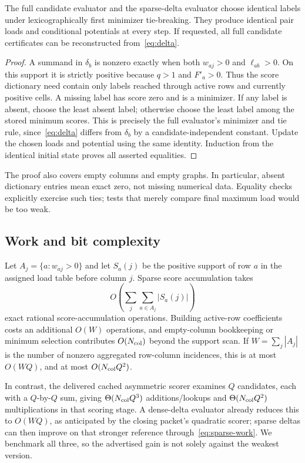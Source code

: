 \documentclass[11pt,letterpaper]{article}
\theoremstyle{remark}\newtheorem{remark}[theorem]{Remark}
\begin{document}
\begin{proposition}\label{prop:sparse}
The full candidate evaluator and the sparse-delta evaluator choose identical labels under lexicographically first minimizer tie-breaking. They produce identical pair loads and conditional potentials at every step. If requested, all full candidate certificates can be reconstructed from~\eqref{eq:delta}.
\end{proposition}
\begin{proof}
A summand in $\delta_b$ is nonzero exactly when both $w_{aj}>0$ and $\ell_{ab}>0$. On this support it is strictly positive because $q>1$ and $F'_a>0$. Thus the score dictionary need contain only labels reached through active rows and currently positive cells. A missing label has score zero and is a minimizer. If any label is absent, choose the least absent label; otherwise choose the least label among the stored minimum scores. This is precisely the full evaluator's minimizer and tie rule, since~\eqref{eq:delta} differs from $\delta_b$ by a candidate-independent constant. Update the chosen loads and potential using the same identity. Induction from the identical initial state proves all asserted equalities.
\end{proof}
The proof also covers empty columns and empty graphs. In particular, absent dictionary entries mean exact zero, not missing numerical data. Equality checks explicitly exercise such ties; tests that merely compare final maximum load would be too weak.

\subsection{Work and bit complexity}
Let $A_j=\{a:w_{aj}>0\}$ and let $S_a(j)$ be the positive support of row $a$ in the assigned load table before column $j$. Sparse score accumulation takes
\begin{equation}\label{eq:sparse-work}
 O\!\left(\sum_j\sum_{a\in A_j}|S_a(j)|\right)
\end{equation}
exact rational score-accumulation operations. Building active-row coefficients costs an additional $O(W)$ operations, and empty-column bookkeeping or minimum selection contributes $O(N_{\rm col})$ beyond the support scan. If $W=\sum_j|A_j|$ is the number of nonzero aggregated row-column incidences, this is at most $O(WQ)$, and at most $O(N_{\rm col}Q^2)$.

In contrast, the delivered cached asymmetric scorer examines $Q$ candidates, each with a $Q$-by-$Q$ sum, giving $\Theta(N_{\rm col}Q^3)$ additions/lookups and $\Theta(N_{\rm col}Q^2)$ multiplications in that scoring stage. A dense-delta evaluator already reduces this to $O(WQ)$, as anticipated by the closing packet's quadratic scorer; sparse deltas can then improve on that stronger reference through~\eqref{eq:sparse-work}. We benchmark all three, so the advertised gain is not solely against the weakest version.
\end{document}
